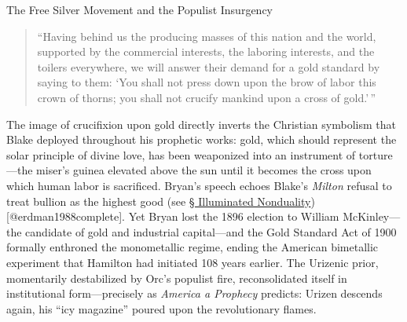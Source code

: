 \documentclass[
  ignorenonframetext,
]{beamer}
\begin{document}
\begin{frame}{The Free Silver Movement and the Populist Insurgency}
\begin{quote}
``Having behind us the producing masses of this nation and the world,
supported by the commercial interests, the laboring interests, and the
toilers everywhere, we will answer their demand for a gold standard by
saying to them: `You shall not press down upon the brow of labor this
crown of thorns; you shall not crucify mankind upon a cross of
gold.'\,''
\end{quote}

The image of crucifixion upon gold directly inverts the Christian
symbolism that Blake deployed throughout his prophetic works: gold,
which should represent the solar principle of divine love, has been
weaponized into an instrument of torture---the miser's guinea elevated
above the sun until it becomes the cross upon which human labor is
sacrificed. Bryan's speech echoes Blake's \emph{Milton} refusal to treat
bullion as the highest good (see
\hyperlink{sec-illuminated-nonduality}{§ Illuminated Nonduality})
{[}@erdman1988complete{]}. Yet Bryan lost the 1896 election to William
McKinley---the candidate of gold and industrial capital---and the Gold
Standard Act of 1900 formally enthroned the monometallic regime, ending
the American bimetallic experiment that Hamilton had initiated 108 years
earlier. The Urizenic prior, momentarily destabilized by Orc's populist
fire, reconsolidated itself in institutional form---precisely as
\emph{America a Prophecy} predicts: Urizen descends again, his ``icy
magazine'' poured upon the revolutionary flames.
\end{frame}
\end{document}
